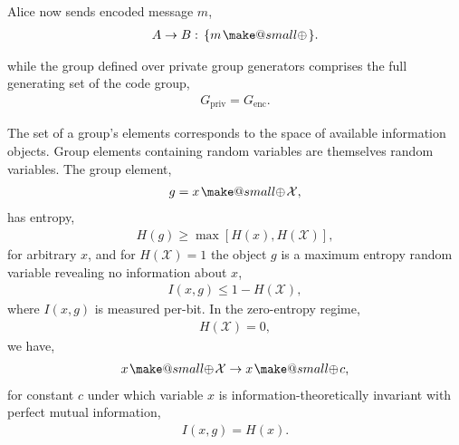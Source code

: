 \documentclass[twocolumn, aps, amsmath, amssymb, nofootinbib, superscriptaddress, longbibliography, doublefloatfix, table-of-contents, eqsecnum, rmp]{revtex4-2}
\makeatletter
\newcommand{\soplus}{{{\hspace{1pt}}{\mathbin{\mathpalette\make@small{\mathbin\oplus}}}}{\hspace{1pt}}}
\newcommand{\make@small}[2]{%
  \vcenter{\hbox{%
    \scalebox{0.6}{$\m@th#1#2$}%
  }}%
}
\makeatother
\begin{document}
Alice now sends encoded message $m$,
\begin{align}
	A\to B:\, \{m \soplus  \}.
\end{align}

while the group defined over private group generators comprises the full generating set of the code group,
\begin{align}
	G_\mathrm{priv} = G_\mathrm{enc}.
\end{align}



The set of a group's elements corresponds to the space of available information objects. Group elements containing random variables are themselves random variables. The group element,
\begin{align}
	g = x\soplus \mathcal{X},
\end{align}
has entropy,
\begin{align}
	H(g) \geq \max[H(x), H(\mathcal{X})],
\end{align}
for arbitrary $x$, and for $H(\mathcal{X})=1$ the object $g$ is a maximum entropy random variable revealing no information about $x$,
\begin{align}
	I(x,g) \leq 1-H(\mathcal{X}),
\end{align}
where $I(x,g)$ is measured per-bit. In the zero-entropy regime,
\begin{align}
	H(\mathcal{X}) = 0,
\end{align}
we have,
\begin{align}
	x\soplus \mathcal{X} \to x\soplus c,
\end{align}	
for constant $c$ under which variable $x$ is information-theoretically invariant with perfect mutual information,
\begin{align}
	I(x,g) = H(x).
\end{align}
\end{document}
